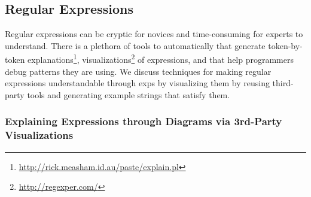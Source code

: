 \begin{figure}
\end{figure}

\subsection{Regular Expressions}

\begin{changes}
Regular expressions can be cryptic for novices and time-consuming for experts to understand.
There is a plethora of tools to automatically that generate token-by-token explanations\footnote{\url{http://rick.measham.id.au/paste/explain.pl}}, visualizations\footnote{\url{http://regexper.com/}} of expressions, and that help programmers debug patterns they are using.
We discuss techniques for making regular expressions understandable through \glspl{exp} by visualizing them by reusing third-party tools and generating example strings that satisfy them.
\end{changes}

\subsubsection{Explaining Expressions through Diagrams via 3rd-Party Visualizations}

